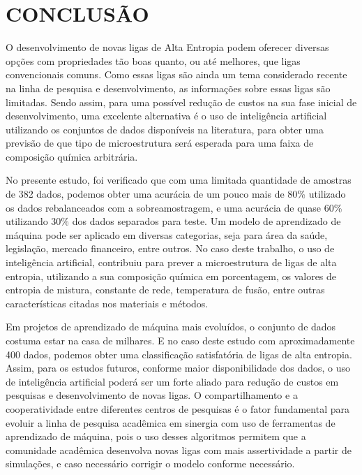 
\chapter{CONCLUSÃO}

O desenvolvimento de novas ligas de Alta Entropia podem oferecer diversas opções com propriedades tão boas quanto, ou até melhores, que ligas convencionais comuns. Como essas ligas são ainda um tema considerado recente na linha de pesquisa e desenvolvimento, as informações sobre essas ligas são limitadas. Sendo assim, para uma possível redução de custos na sua fase inicial de desenvolvimento, uma excelente alternativa é o uso de inteligência artificial utilizando os conjuntos de dados disponíveis na literatura, para obter uma previsão de que tipo de microestrutura será esperada para uma faixa de composição química arbitrária. 

No presente estudo, foi verificado que com uma limitada quantidade de amostras de 382 dados, podemos obter uma acurácia de um pouco mais de 80\% utilizado os dados rebalanceados com a sobreamostragem, e uma acurácia de quase 60\% utilizando 30\% dos dados separados para teste. Um modelo de aprendizado de máquina pode ser aplicado em diversas categorias, seja para área da saúde, legislação, mercado financeiro, entre outros. No caso deste trabalho, o uso de inteligência artificial, contribuiu para prever a microestrutura de ligas de alta entropia, utilizando a sua composição química em porcentagem, os valores de entropia de mistura, constante de rede, temperatura de fusão, entre outras características citadas nos materiais e métodos.


Em projetos de aprendizado de máquina mais evoluídos, o conjunto de dados costuma estar na casa de milhares. E no caso deste estudo com aproximadamente 400 dados, podemos obter uma classificação satisfatória de ligas de alta entropia. Assim, para os estudos futuros, conforme  maior disponibilidade dos dados, o uso de inteligência artificial poderá ser um forte aliado para redução de custos em pesquisas e desenvolvimento de novas ligas. O compartilhamento e a cooperatividade entre diferentes centros de pesquisas é o fator fundamental para evoluir a linha de pesquisa acadêmica em sinergia com uso de ferramentas de aprendizado de máquina, pois o uso desses algoritmos permitem que a comunidade acadêmica desenvolva novas ligas com mais assertividade a partir de simulações, e caso necessário corrigir o modelo conforme necessário. 




